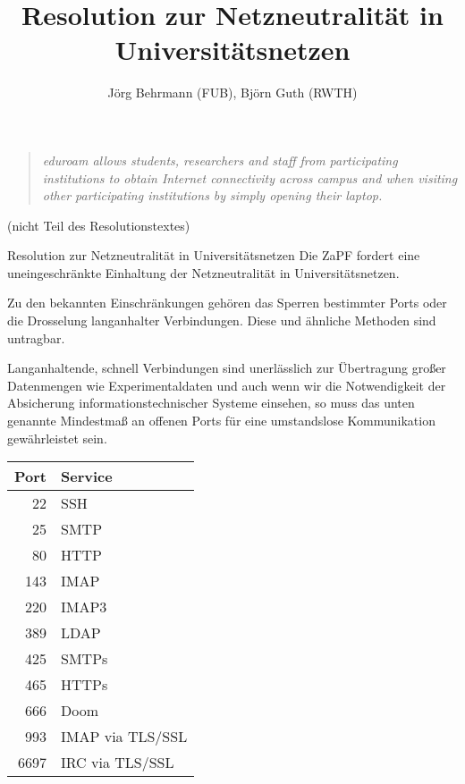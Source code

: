 \documentclass[aspectratio=43]{beamer}
\title{Resolution zur Netzneutralität in Universitätsnetzen}
\author{Jörg Behrmann (FUB), Björn Guth (RWTH)}
\date{}
\begin{document}
\begin{frame}
	\maketitle
\end{frame}

\begin{frame}
	\begin{quote}
	\textit{eduroam allows students, researchers and staff from participating institutions to obtain Internet connectivity across campus and when visiting other participating institutions by simply opening their laptop.}
	
	\end{quote}
	\vfill\hfill \tiny{(nicht Teil des Resolutionstextes)}
\end{frame}

\begin{frame}{Resolution zur Netzneutralität in Universitätsnetzen}
Die ZaPF fordert eine uneingeschränkte Einhaltung der Netzneutralität in Universitätsnetzen.

Zu den bekannten Einschränkungen gehören das Sperren bestimmter Ports oder die
Drosselung langanhalter Verbindungen. Diese und ähnliche Methoden sind
untragbar.

Langanhaltende, schnell Verbindungen sind unerlässlich zur Übertragung großer
Datenmengen wie Experimentaldaten und auch wenn wir die Notwendigkeit der
Absicherung informationstechnischer Systeme einsehen, so muss das unten genannte Mindestmaß an offenen Ports für
eine umstandslose Kommunikation gewährleistet sein.
\end{frame}

\begin{frame}
\begin{center}
\begin{tabular}{rl}
	\toprule
	Port & Service \\
	\midrule
	22 & SSH \\
	25 & SMTP \\
	80 & HTTP \\
	143 & IMAP \\
	220 & IMAP3 \\
	389 & LDAP \\
	425 & SMTPs \\
	465 & HTTPs \\
	666 & Doom \\
	993 & IMAP via TLS/SSL \\
	6697 & IRC via TLS/SSL \\
	\bottomrule
\end{tabular}
\end{center}
\end{frame}
\end{document}
